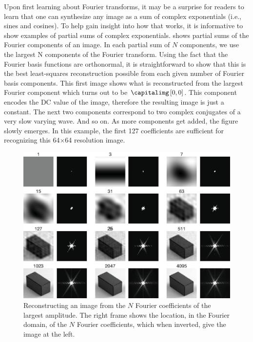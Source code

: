 Upon first learning about Fourier transforms, it may be a surprise for readers to learn that one can synthesize any image as a sum of complex exponentials (i.e., sines and cosines).  To help gain insight into how that works, it is informative to show examples of partial sums of complex exponentials. \Fig{\ref{fig:DFT_b}} shows partial sums of the Fourier components
of an image.  In each partial sum of $N$ components, we use the largest N components of the Fourier transform.
Using the fact that the Fourier basis functions are orthonormal, it is straightforward to show that this is the best least-squares reconstruction possible from each given number of Fourier basis
components.  This first image shows what is reconstructed from the largest Fourier component which turns out to be $\capitalimg \left[0,0 \right]$. This component encodes the DC value of the image, therefore the resulting image is just a constant. The next two components correspond to two complex conjugates of a very slow varying wave. And so on. As more components get added, the figure slowly emerges. In this example, the first 127 coefficients are sufficient for recognizing this 64$\times$64 resolution image.


\begin{figure}[t]
\centerline{
\includegraphics[width=1\linewidth]{figures/Image_processing_fourier/dft_b.eps}
}
\caption{Reconstructing an image from the $N$ Fourier coefficients of
  the largest amplitude.  The right frame shows the location, in the
  Fourier domain, of the $N$ Fourier coefficients, which when
  inverted, give the image at the left.
} 
\label{fig:DFT_b}
\end{figure}

